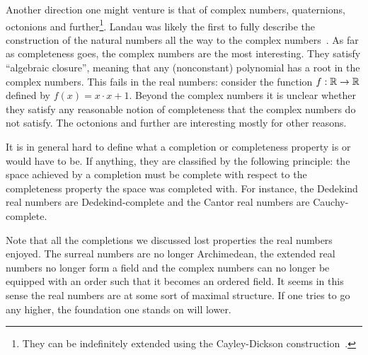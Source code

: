 \documentclass[../main.tex]{subfiles}
\begin{document}
Another direction one might venture is that of complex numbers, quaternions, octonions and further\footnote{They can be indefinitely extended using the Cayley-Dickson construction~\cite{Dickson1919}.}. Landau was likely the first to fully describe the construction of the natural numbers all the way to the complex numbers~\cite{Landau1930}. As far as completeness goes, the complex numbers are the most interesting. They satisfy ``algebraic closure'', meaning that any (nonconstant) polynomial has a root in the complex numbers. This fails in the real numbers: consider the function $f:\mathbb{R}\to\mathbb{R}$ defined by $f(x)=x\cdot x+1$. Beyond the complex numbers it is unclear whether they satisfy any reasonable notion of completeness that the complex numbers do not satisfy. The octonions and further are interesting mostly for other reasons.

It is in general hard to define what a completion or completeness property is or would have to be. If anything, they are classified by the following principle: the space achieved by a completion must be complete with respect to the completeness property the space was completed with. For instance, the Dedekind real numbers are Dedekind-complete and the Cantor real numbers are Cauchy-complete.

Note that all the completions we discussed lost properties the real numbers enjoyed. The surreal numbers are no longer Archimedean, the extended real numbers no longer form a field and the complex numbers can no longer be equipped with an order such that it becomes an ordered field. It seems in this sense the real numbers are at some sort of maximal structure. If one tries to go any higher, the foundation one stands on will lower.
\end{document}
